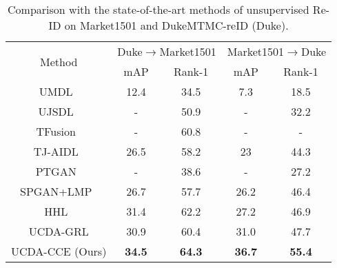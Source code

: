 \documentclass[10pt,twocolumn,letterpaper]{article}
\begin{document}
\renewcommand{\cmidrulesep}{0mm} 
\setlength{\aboverulesep}{0mm} 
\setlength{\belowrulesep}{0mm} 
\setlength{\abovetopsep}{0cm} 
\setlength{\belowbottomsep}{0cm}
\begin{table}[htbp]
 \centering
 \caption{Comparison with the state-of-the-art methods of unsupervised Re-ID on Market1501 and DukeMTMC-reID (Duke). }
 \begin{adjustbox}{width=0.45\textwidth}
   \begin{tabular}{|c|cc|cc|}
   \toprule
   \multirow{2}[2]{*}{Method} & \multicolumn{2}{c|}{Duke$\rightarrow$Market1501} & \multicolumn{2}{c|}{Market1501$\rightarrow$Duke} \\
\cmidrule{2-5}         & mAP  & Rank-1 & mAP  & Rank-1 \\
   \midrule
   UMDL~\cite{DBLP:conf/cvpr/PengXWPGHT16} & 12.4 & 34.5 & 7.3  & 18.5 \\
   UJSDL~\cite{qi2018unsupervised} & - & 50.9 & -     & 32.2 \\
   \midrule
   TFusion~\cite{lv2018unsupervised}  & - & 60.8 & -     & - \\
   TJ-AIDL~\cite{wang2018transferable} & 26.5 & 58.2 & 23   & 44.3 \\
   \midrule
   PTGAN~\cite{wei2018person} & -     & 38.6 & -     & 27.2 \\
   SPGAN+LMP~\cite{deng2018image} & 26.7 & 57.7 & 26.2 & 46.4 \\
   HHL~\cite{zhong2018generalizing}  & 31.4 & 62.2 & 27.2 & 46.9 \\
   \midrule
    UCDA-GRL & 30.9 & 60.4 & 31.0 & 47.7 \\
   UCDA-CCE (Ours) & \textcolor[rgb]{ 1, 0, 0}{\textbf{34.5}} & \textcolor[rgb]{ 1, 0, 0}{\textbf{64.3}} & \textcolor[rgb]{ 1, 0, 0}{\textbf{36.7}} & \textcolor[rgb]{ 1, 0, 0}{\textbf{55.4}} \\
   \bottomrule
   \end{tabular}\end{adjustbox}
 \label{tab04}\vspace*{-5pt}
\end{table}
\end{document}
